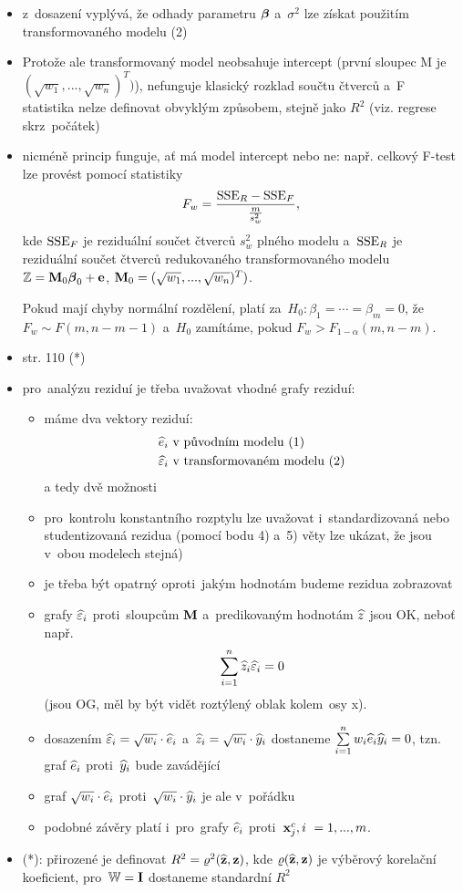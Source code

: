 \begin{itemize}
	\item z~dosazení vyplývá, že odhady parametru $\boldsymbol{\beta}$ a~$\sigma^2$ lze získat použitím transformovaného modelu (2)
	\item Protože ale transformovaný model neobsahuje intercept (první sloupec M je $(\sqrt{w_1},..., \sqrt{w_n})^T)$), nefunguje klasický rozklad součtu čtverců a~F statistika nelze definovat obvyklým způsobem, stejně jako $R^2$ (viz. regrese skrz~počátek)
	\item nicméně princip  funguje, ať má model intercept nebo ne:
	např. celkový F-test lze provést pomocí statistiky
	 $$
	F_w = \frac{\mathrm{SSE}_R - \mathrm{SSE}_F}{\frac{m}{s_w^2}},
	 $$
	kde $\mathrm{SSE}_F$ je reziduální součet čtverců $s_w^2$ plného modelu a~$\mathrm{SSE}_R$ je reziduální součet čtverců redukovaného transformovaného modelu $\mathbb{Z} = \textbf{M}_0 \boldsymbol{\beta}_0 + \mathbf{e}$, $\textbf{M}_0 = (\sqrt{w_1},..., \sqrt{w_n})^T)$.
	
	Pokud mají chyby normální rozdělení, platí za~$H_0: \beta_1 = \cdots = \beta_m = 0$, že $F_w \sim F(m, n-m-1)$ a~$H_0$ zamítáme, pokud $F_w > F_{1-\alpha}(m,n-m)$.
	\item str. 110 (*)
	\item pro~analýzu reziduí je třeba uvažovat vhodné grafy reziduí:
	\begin{itemize}
		\item máme dva vektory reziduí:
		\begin{align*}
			& \widehat{e}_i \text{ v~původním modelu (1)} \\
			& \widehat{\varepsilon}_i \text{ v~transformovaném modelu (2)}
		\end{align*}
		a tedy dvě možnosti
		\item pro~kontrolu konstantního rozptylu lze uvažovat i~standardizovaná nebo studentizovaná rezidua (pomocí bodu 4) a~5) věty lze ukázat, že jsou v~obou modelech stejná)
		\item je třeba být opatrný oproti~jakým hodnotám budeme rezidua zobrazovat
		\item grafy $\widehat{\varepsilon}_i$ proti~sloupcům $\textbf{M}$ a~predikovaným hodnotám $\widehat{z}$ jsou OK, neboť např.
		 $$
		\sum\limits_{i=1}^{n} \widehat{z}_i \widehat{\varepsilon}_i = 0
		 $$
		(jsou OG, měl by být vidět roztýlený oblak kolem~osy x).
		\item dosazením $\widehat{\varepsilon}_i = \sqrt{w_i}  \cdot \widehat{e}_i$ a~$\widehat{z}_i = \sqrt{w_i} \cdot \widehat{y}_i$ dostaneme $\sum\limits_{i=1}^{n} w_i \widehat{e}_i \widehat{y}_i = 0$, tzn. graf $\widehat{e}_i$ proti~$\widehat{y}_i$ bude zavádějící
		\item graf $\sqrt{w_i}  \cdot \widehat{e}_i$ proti~$\sqrt{w_i}  \cdot \widehat{y}_i$ je ale v~pořádku
		\item podobné závěry platí i~pro~grafy $\widehat{e}_i$ proti~$\mathbf{x}_j^c, i~ = 1,..., m$.
 	\end{itemize}
 	\item (*): přirozené je definovat $R^2 = \varrho^2(\widehat{\mathbf{z}}, \mathbf{z})$, kde $\varrho(\widehat{\mathbf{z}}, \mathbf{z})$ je výběrový korelační koeficient, pro~$\mathbb{W} = \textbf{I}$ dostaneme standardní $R^2$
\end{itemize}

